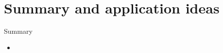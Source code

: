 \section{Summary and application ideas}

\begin{frame}{Summary}
	\begin{itemize}
		\item 
	\end{itemize}
\end{frame}